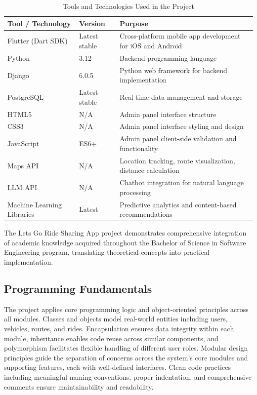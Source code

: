 \begin{table}[htbp]
\centering
\caption{Tools and Technologies Used in the Project}
\renewcommand{\arraystretch}{1.3}
\begin{tabularx}{\textwidth}{|p{4cm}|p{3cm}|X|}
\hline
\textbf{Tool / Technology} & \textbf{Version} & \textbf{Purpose} \\
\hline
Flutter (Dart SDK) & Latest stable & Cross-platform mobile app development for iOS and Android \\
\hline
Python & 3.12 & Backend programming language \\
\hline
Django & 6.0.5 & Python web framework for backend implementation \\
\hline
PostgreSQL & Latest stable & Real-time data management and storage \\
\hline
HTML5 & N/A & Admin panel interface structure \\
\hline
CSS3 & N/A & Admin panel interface styling and design \\
\hline
JavaScript & ES6+ & Admin panel client-side validation and functionality \\
\hline
Maps API & N/A & Location tracking, route visualization, distance calculation \\
\hline
LLM API & N/A & Chatbot integration for natural language processing \\
\hline
Machine Learning Libraries & Latest & Predictive analytics and content-based recommendations \\
\hline
\end{tabularx}
\end{table}


The Lets Go Ride Sharing App project demonstrates comprehensive integration of academic knowledge acquired throughout the Bachelor of Science in Software Engineering program, translating theoretical concepts into practical implementation.

\subsection{Programming Fundamentals}

The project applies core programming logic and object-oriented principles across all modules. Classes and objects model real-world entities including users, vehicles, routes, and rides. Encapsulation ensures data integrity within each module, inheritance enables code reuse across similar components, and polymorphism facilitates flexible handling of different user roles. Modular design principles guide the separation of concerns across the system's core modules and supporting features, each with well-defined interfaces. Clean code practices including meaningful naming conventions, proper indentation, and comprehensive comments ensure maintainability and readability.

